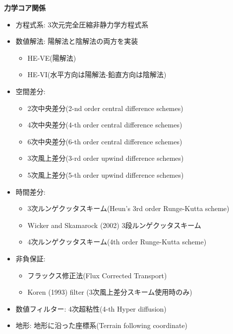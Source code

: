 {\bf 力学コア関係}
\begin{itemize}
 \item 方程式系: 3次元完全圧縮非静力学方程式系
 \item 数値解法: 陽解法と陰解法の両方を実装
   \begin{itemize}
    \item HE-VE(陽解法)
    \item HE-VI(水平方向は陽解法-鉛直方向は陰解法)
   \end{itemize}
 \item 空間差分:
    \begin{itemize}
      \item 2次中央差分(2-nd order central difference schemes)
      \item 4次中央差分(4-th order central difference schemes)
      \item 6次中央差分(6-th order central difference schemes)
      \item 3次風上差分(3-rd order upwind difference schemes)
      \item 5次風上差分(5-th order upwind difference schemes)
    \end{itemize}
 \item 時間差分:
    \begin{itemize}
      \item 3次ルンゲクッタスキーム(Heun's 3rd order Runge-Kutta scheme)
      \item Wicker and Skamarock (2002) 3段ルンゲクッタスキーム \citep[3-step Runge-Kutta scheme of ][]{Wicker_2002}
      \item 4次ルンゲクッタスキーム(4th order Runge-Kutta scheme)
    \end{itemize}
 \item 非負保証:
    \begin{itemize}
      \item フラックス修正法(Flux Corrected Transport)
      \item Koren (1993) filter \citep{Koren_1993} (3次風上差分スキーム使用時のみ)
    \end{itemize}
 \item 数値フィルター: 4次超粘性(4-th Hyper diffusion)
 \item 地形: 地形に沿った座標系(Terrain following coordinate)
\end{itemize}


